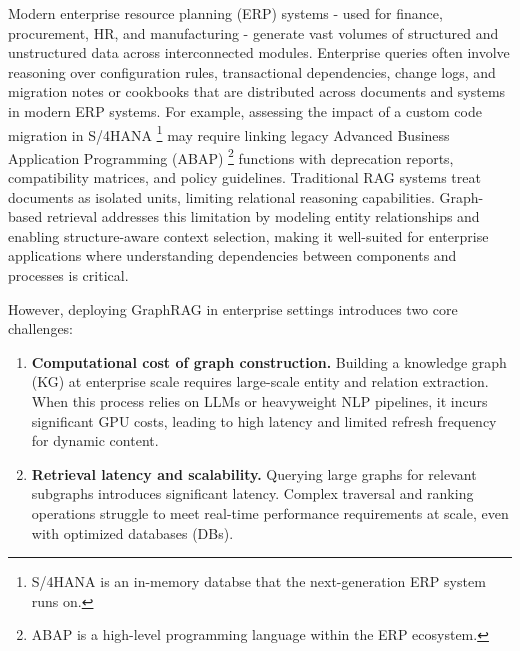 \documentclass[runningheads]{llncs}
\begin{document}
Modern enterprise resource planning (ERP) systems - used for finance, procurement, HR, and manufacturing - generate vast volumes of structured and unstructured data across interconnected modules. Enterprise queries often involve reasoning over configuration rules, transactional dependencies, change logs, and migration notes or cookbooks that are distributed across documents and systems in modern ERP systems. For example, assessing the impact of a custom code migration in S/4HANA \footnote{S/4HANA is an in-memory databse that the next-generation ERP system runs on.} may require linking legacy Advanced Business Application Programming (ABAP) \footnote{ABAP is a high-level programming language within the ERP ecosystem.} functions with deprecation reports, compatibility matrices, and policy guidelines. Traditional RAG systems treat documents as isolated units, limiting relational reasoning capabilities. Graph-based retrieval addresses this limitation by modeling entity relationships and enabling structure-aware context selection, making it well-suited for enterprise applications where understanding dependencies between components and processes is critical.

However, deploying GraphRAG in enterprise settings introduces two core challenges:
\begin{enumerate}
    \item \textbf{Computational cost of graph construction.} Building a knowledge graph (KG) at enterprise scale requires large-scale entity and relation extraction. When this process relies on LLMs or heavyweight NLP pipelines, it incurs significant GPU costs, leading to high latency and limited refresh frequency for dynamic content.
    \item \textbf{Retrieval latency and scalability.} Querying large graphs for relevant subgraphs introduces significant latency. Complex traversal and ranking operations struggle to meet real-time performance requirements at scale, even with optimized databases (DBs).
\end{enumerate}
\end{document}
